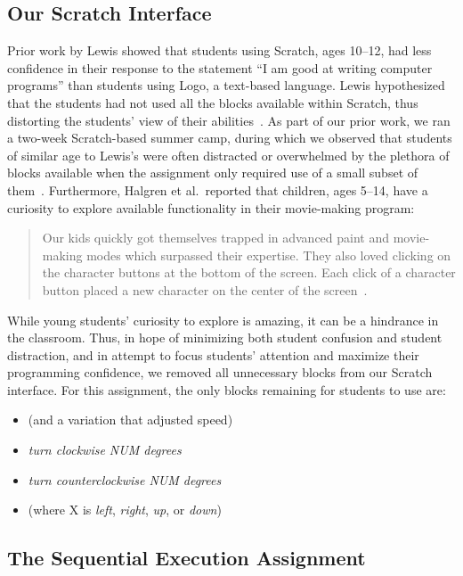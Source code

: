\subsection{Our Scratch Interface} 
Prior work by Lewis showed that students using Scratch, ages 10--12, had less
confidence in their response to the statement ``I am good at writing computer
programs'' than students using Logo, a text-based language. Lewis hypothesized
that the students had not used all the blocks available within Scratch, thus
distorting the students' view of their
abilities~\cite{Lewis:2010:PES:1734263.1734383}. As part of our prior work, we
ran a two-week Scratch-based summer camp, during which we observed that
students of similar age to Lewis's were often distracted or overwhelmed by the
plethora of blocks available when the assignment only required use of a small
subset of them~\cite{Franklin:2013:SBO}. Furthermore, Halgren et al.\ reported
that children, ages 5--14, have a curiosity to explore available functionality
in their movie-making program:

\begin{quote}
Our kids quickly got themselves trapped in advanced paint and movie-making
modes which surpassed their expertise. They also loved clicking on the
character buttons at the bottom of the screen. Each click of a character button
placed a new character on the center of the
screen~\cite{Halgren:1995:AAM:223904.223974}.
\end{quote}

While young students' curiosity to explore is amazing, it can be a hindrance in
the classroom. Thus, in hope of minimizing both student confusion and student
distraction, and in attempt to focus students' attention and maximize their
programming confidence, we removed all unnecessary blocks from our Scratch
interface. For this assignment, the only blocks remaining for students to use
are:

\begin{itemize}
\item \glideDIST{} (and a variation that adjusted speed)
\item \emph{turn clockwise NUM degrees}
\item \emph{turn counterclockwise NUM degrees}
\item \pointDIR{} (where X is \emph{left}, \emph{right}, \emph{up}, or
  \emph{down})
\end{itemize}

\subsection{The Sequential Execution Assignment}

